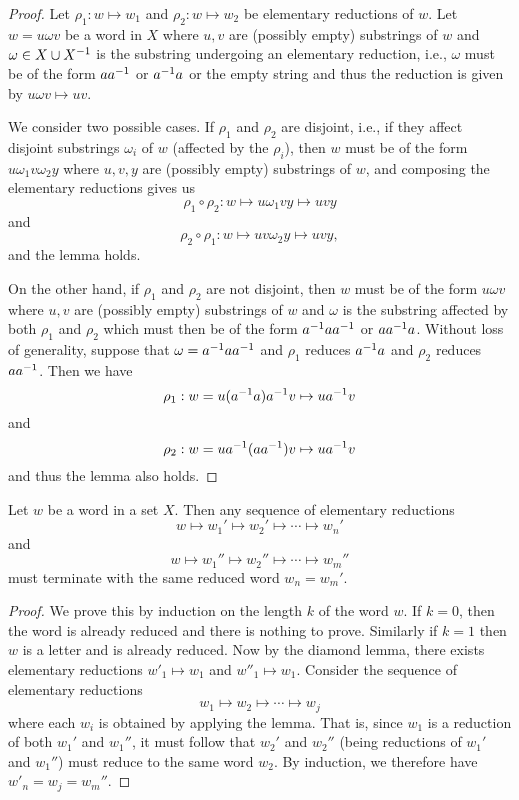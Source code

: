 \begin{proof}
    Let \(\rho_1 : w \mapsto w_1\) and \(\rho_2 : w \mapsto w_2\) be elementary
    reductions of \(w\). Let \(w = u\omega v\) be a word in \(X\) where \(u, v\)
    are (possibly empty) substrings of \(w\) and \(\omega \in X \cup X^{-1}\) is
    the substring undergoing an elementary reduction, i.e., \(\omega\) must be
    of the form \(aa^{-1}\) or \(a^{-1} a\) or the empty string and thus the
    reduction is given by \(u\omega v \mapsto uv\).

    We consider two possible cases. If \(\rho_1\) and \(\rho_2\) are disjoint,
    i.e., if they affect disjoint substrings \(\omega_i\) of \(w\) (affected by
    the \(\rho_i\)), then \(w\) must be of the form \(u\omega_1v\omega_2y\)
    where \(u, v, y\) are (possibly empty) substrings of \(w\), and composing
    the elementary reductions gives us
    \[
        \rho_1 \circ \rho_2 : w \mapsto u\omega_1vy \mapsto uvy
    \]
    and 
    \[
        \rho_2 \circ \rho_1 : w \mapsto uv\omega_2y \mapsto uvy,
    \]
    and the lemma holds.

    On the other hand, if \(\rho_1\) and \(\rho_2\) are not disjoint, then \(w\)
    must be of the form \(u\omega v\) where \(u, v\) are (possibly empty)
    substrings of \(w\) and \(\omega\) is the substring affected by both
    \(\rho_1\) and \(\rho_2\) which must then be of the form \(a^{-1} aa^{-1}\) or
    \(aa^{-1} a\). Without loss of generality, suppose that \(\omega = a^{-1}
    aa^{-1}\) and \(\rho_1\) reduces \(a^{-1} a\) and \(\rho_2\) reduces
    \(aa^{-1}\). Then we have
    \[
        \rho_1 : w = u(a^{-1} a)a^{-1} v \mapsto ua^{-1} v
    \]
    and
    \[
        \rho_2 : w = ua^{-1}(aa^{-1})v \mapsto ua^{-1} v
    \]
    and thus the lemma also holds.
\end{proof}

\begin{theorem}
    Let \(w\) be a word in a set \(X\). Then any sequence of elementary
    reductions
    \[
        w \mapsto w_1' \mapsto w_2' \mapsto \cdots \mapsto w_n'
    \]
    and
    \[
        w  \mapsto w_1'' \mapsto w_2'' \mapsto \cdots \mapsto w_m''
    \]
    must terminate with the same reduced word \(w_n = w_m'\).
\end{theorem}

\begin{proof}
    We prove this by induction on the length \(k\) of the word \(w\). If \(k =
    0\), then the word is already reduced and there is nothing to prove.
    Similarly if \(k = 1\) then \(w\) is a letter and is already reduced. Now by
    the diamond lemma, there exists elementary reductions \(w'_1 \mapsto w_1\)
    and \(w''_1 \mapsto w_1\). Consider the sequence of elementary reductions
    \[
        w_1 \mapsto w_2 \mapsto \cdots \mapsto w_j
    \]
    where each \(w_i\) is obtained by applying the lemma. That is, since \(w_1\)
    is a reduction of both \(w_1'\) and \(w_1''\), it must follow that \(w_2'\)
    and \(w_2''\) (being reductions of \(w_1'\) and \(w_1''\)) must reduce to
    the same word \(w_2\). By induction, we therefore have \(w'_n = w_j =
    w_m''\).
\end{proof}

